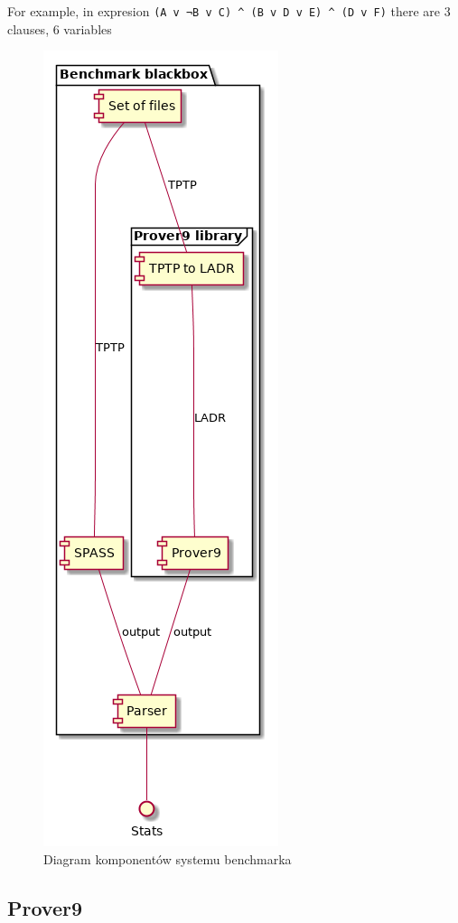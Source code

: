 \documentclass[a4paper,12pt]{article}
\begin{document}
For example, in expresion \texttt{(A v ¬B v C) ^ (B v D v E) ^ (D v F)} there are 3 clauses, 6 variables

\begin{figure}[H]
  \centering
  \includegraphics[scale=0.5]{benchmark/components.png}
  \caption{Diagram komponentów systemu benchmarka}
\end{figure}

\subsection{Prover9}
\end{document}

